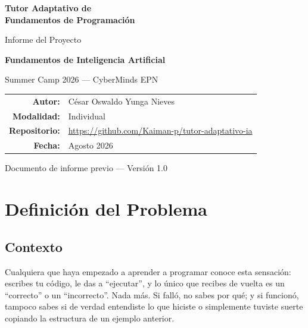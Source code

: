 \documentclass[11pt,letterpaper]{article}
\begin{document}
\begin{titlepage}
\centering
\vspace*{2cm}

{\Huge\bfseries\color{rojoepn} Tutor Adaptativo de\\ Fundamentos de Programación\par}
\vspace{0.5cm}
{\Large Informe del Proyecto\par}
\vspace{1.5cm}

{\large\textbf{Fundamentos de Inteligencia Artificial}\par}
{\large Summer Camp 2026 --- CyberMinds EPN\par}
\vspace{2cm}

\begin{tabular}{rl}
\textbf{Autor:} & César Oswaldo Yunga Nieves \\[0.3cm]
\textbf{Modalidad:} & Individual \\[0.3cm]
\textbf{Repositorio:} & \url{https://github.com/Kaiman-p/tutor-adaptativo-ia} \\[0.3cm]
\textbf{Fecha:} & Agosto 2026 \\
\end{tabular}

\vfill
{\small Documento de informe previo --- Versión 1.0\par}
\end{titlepage}

\tableofcontents
\newpage

\section{Definición del Problema}

\subsection{Contexto}
Cualquiera que haya empezado a aprender a programar conoce esta
sensación: escribes tu código, le das a ``ejecutar'', y lo único que
recibes de vuelta es un ``correcto'' o un ``incorrecto''. Nada más. Si
falló, no sabes por qué; y si funcionó, tampoco sabes si de verdad
entendiste lo que hiciste o simplemente tuviste suerte copiando la
estructura de un ejemplo anterior.
\end{document}
